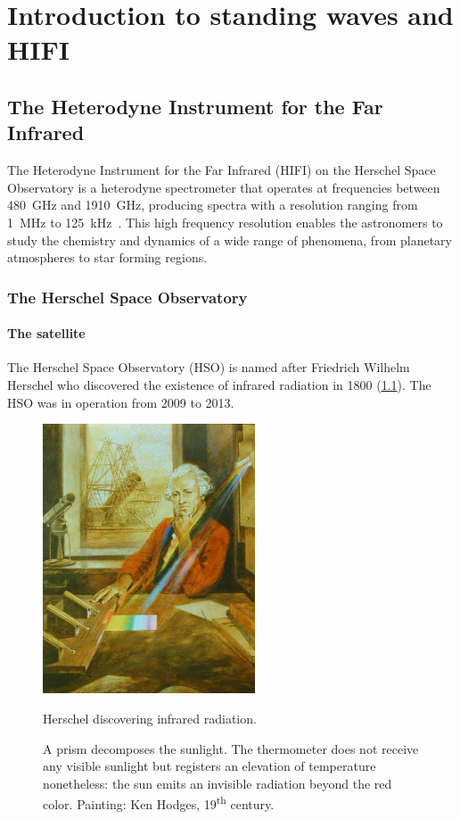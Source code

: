 \cleardoublepage
\chapter{Introduction to standing waves and HIFI}
\label{sec:chapter1}



\section{The Heterodyne Instrument for the Far Infrared}

The Heterodyne Instrument for the Far Infrared (HIFI) on the Herschel Space Observatory is a heterodyne spectrometer that operates at frequencies between \SI{480}{\giga\hertz} and \SI{1910}{\giga\hertz},
producing spectra with a resolution ranging from \SI{1}{\mega\hertz} to \SI{125}{\kilo\hertz}~\cite{AA_518_L6}.
This high frequency resolution enables the astronomers to study the chemistry and dynamics of a wide range of phenomena, from planetary atmospheres to star forming regions.




\subsection{The Herschel Space Observatory}
\subsubsection{The satellite}
The Herschel Space Observatory (HSO) is named after Friedrich Wilhelm Herschel who discovered the existence of infrared radiation in 1800 (\cref{fig:herschel_discovers_infrared}).
The HSO was in operation from 2009 to 2013.
\begin{figure}[htbp]
    \centering
    \includegraphics[height=8cm]{herschel_discovers_infrared}
    \caption{Herschel discovering infrared radiation.}
    \caption*{
        A prism decomposes the sunlight.
        The thermometer does not receive any visible sunlight but registers an elevation of temperature nonetheless:
        the sun emits an invisible radiation beyond the red color.
        Painting: Ken Hodges, 19\textsuperscript{th} century.
    }
    \label{fig:herschel_discovers_infrared}
\end{figure}

